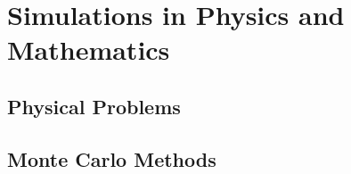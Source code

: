 \documentclass{stdlocal}
\begin{document}
  \section{Simulations in Physics and Mathematics} %
  \label{sub:simulation_in_physics_and_mathematics}
    \subsection{Physical Problems} %
    \label{sub:physical_problems}

    \subsection{Monte Carlo Methods} %
    \label{sub:monte_carlo_methods}

\end{document}
